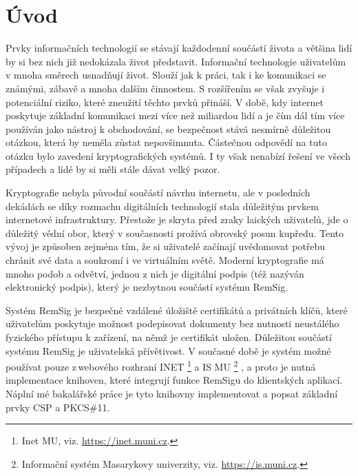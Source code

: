 \documentclass[]{fithesis3}
\begin{document}
\chapter{Úvod}

Prvky informačních technologií se stávají každodenní součástí života a většina lidí by si bez nich již nedokázala život představit. Informační technologie uživatelům v mnoha směrech usnadňují život. Slouží jak k práci, tak i ke komunikaci se známými, zábavě a mnoha dalším činnostem. S rozšířením se však zvyšuje i potenciální riziko, které zneužití těchto prvků přináší. V době, kdy internet poskytuje základní komunikaci mezi více než miliardou lidí a je čím dál tím více používán jako nástroj k obchodování, se bezpečnost stává nesmírně důležitou otázkou, která by neměla zůstat nepovšimnuta. Částečnou odpovědí na tuto otázku bylo zavedení kryptografických systémů. I ty však nenabízí řešení ve všech případech a lidé by si měli stále dávat velký pozor. 

Kryptografie nebyla původní součástí návrhu internetu, ale v posledních dekádách se díky rozmachu digitálních technologií stala důležitým prvkem internetové infrastruktury. Přestože je skryta před zraky laických uživatelů, jde o důležitý vědní obor, který v současnosti prožívá obrovský posun kupředu. Tento vývoj je způsoben zejména tím, že si uživatelé začínají uvědomovat potřebu chránit své data a soukromí i ve virtuálním světě. Moderní kryptografie má mnoho podob a odvětví, jednou z nich je digitální podpis (též nazýván elektronický podpis), který je nezbytnou součástí systému RemSig.

Systém RemSig je bezpečné vzdálené úložiště certifikátů a privátních klíčů, které uživatelům poskytuje možnost podepisovat dokumenty bez nutnosti neustálého fyzického přístupu k zařízení, na němž je certifikát uložen. Důležitou součástí systému RemSig je uživatelská přívětivost. V současné době je systém možné používat pouze z\,webového rozhraní INET
\footnote{Inet MU, viz. \url{https://inet.muni.cz}.} 
a IS MU
\footnote{Informační systém Masarykovy univerzity, viz. \url{https://is.muni.cz}.}
, a proto je nutná implementace knihoven, které integrují funkce RemSigu do klientských aplikací. Náplní mé bakalářské práce je tyto knihovny implementovat a popsat základní prvky CSP a PKCS\#11. 
\end{document}
